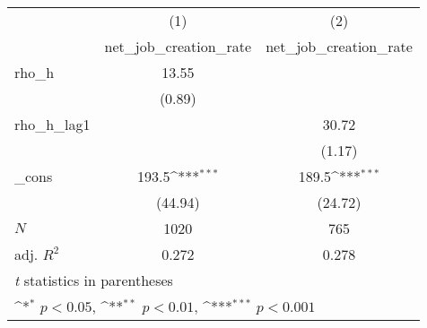 {
\def\sym#1{\ifmmode^{#1}\else\(^{#1}\)\fi}
\begin{tabular}{l*{2}{c}}
\toprule
            &\multicolumn{1}{c}{(1)}&\multicolumn{1}{c}{(2)}\\
            &\multicolumn{1}{c}{net\_job\_creation\_rate}&\multicolumn{1}{c}{net\_job\_creation\_rate}\\
\midrule
rho\_h       &       13.55         &                     \\
            &      (0.89)         &                     \\
\addlinespace
rho\_h\_lag1  &                     &       30.72         \\
            &                     &      (1.17)         \\
\addlinespace
\_cons      &       193.5\sym{***}&       189.5\sym{***}\\
            &     (44.94)         &     (24.72)         \\
\midrule
\(N\)       &        1020         &         765         \\
adj. \(R^{2}\)&       0.272         &       0.278         \\
\bottomrule
\multicolumn{3}{l}{\footnotesize \textit{t} statistics in parentheses}\\
\multicolumn{3}{l}{\footnotesize \sym{*} \(p<0.05\), \sym{**} \(p<0.01\), \sym{***} \(p<0.001\)}\\
\end{tabular}
}
